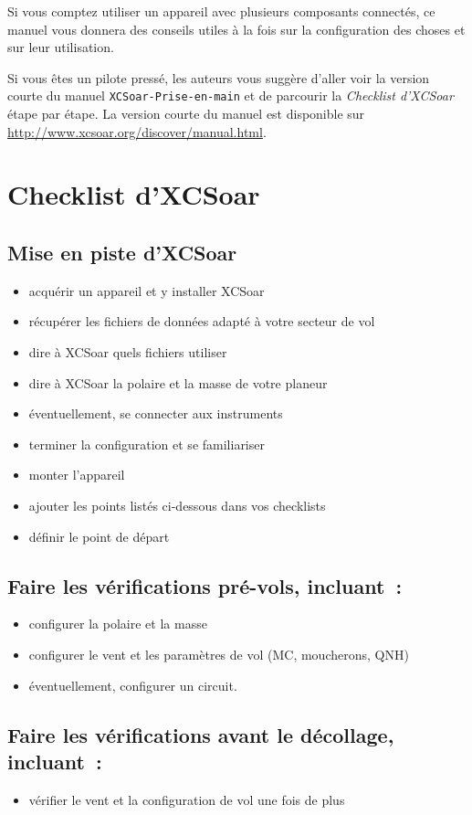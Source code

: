Si vous comptez utiliser un appareil avec plusieurs composants connectés,
ce manuel vous donnera des conseils utiles à la fois sur la configuration des choses et sur
leur utilisation.

Si vous êtes un pilote pressé, les auteurs vous suggère d'aller voir la version courte
du manuel \texttt{XCSoar-Prise-en-main} et de parcourir la \emph{Checklist d'XCSoar}
étape par étape. La version courte du manuel est disponible sur \url{http://www.xcsoar.org/discover/manual.html}.

\section{Checklist d'XCSoar}

\subsection*{{Mise en piste d'XCSoar}}
\begin{itemize}
\item acquérir un appareil et y installer XCSoar
\item récupérer les fichiers de données adapté à votre secteur de vol
\item dire à XCSoar quels fichiers utiliser
\item dire à XCSoar la polaire et la masse de votre planeur
\item éventuellement, se connecter aux instruments
\item terminer la configuration et se familiariser
\item monter l'appareil
\item ajouter les points listés ci-dessous dans vos checklists
\item définir le point de départ
\end{itemize}

\subsection*{Faire les vérifications pré-vols, incluant~:}
\begin{itemize}
\item configurer la polaire et la masse
\item configurer le vent et les paramètres de vol (MC, moucherons, QNH)
\item éventuellement, configurer un circuit.
\end{itemize}

\subsection*{Faire les vérifications avant le décollage, incluant~:}
\begin{itemize}
\item vérifier le vent et la configuration de vol une fois de plus
\end{itemize}
\vspace{2em}

